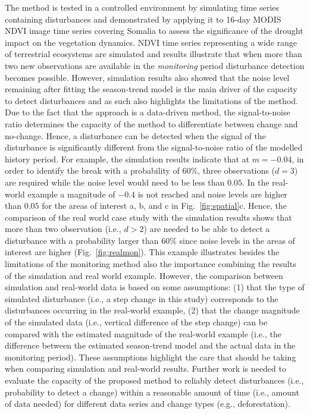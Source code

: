 \documentclass[authoryear,preprint,review,10pt]{elsarticle}
\begin{document}
The method is tested in a controlled environment by simulating time series containing disturbances and demonstrated by applying it to 16-day MODIS NDVI image time series covering Somalia to assess the significance of the drought impact on the vegetation dynamics. NDVI time series representing a wide range of terrestrial ecosystems are simulated and results illustrate that when more than two new observations are available in the \emph{monitoring} period disturbance detection becomes possible. However, simulation results also showed that the noise level remaining after fitting the season-trend model is the main driver of the capacity to detect disturbances and as such also highlights the limitations of the method. Due to the fact that the approach is a data-driven method, the signal-to-noise ratio determines the capacity of the method to differentiate between change and no-change. Hence, a disturbance can be detected when the signal of the disturbance is significantly different from the signal-to-noise ratio of the modelled history period. For example, the simulation results indicate that at $m = -0.04$, in order to identify the break with a probability of $60\%$, three observations ($d=3$) are required while the noise level would need to be less than $0.05$. In the real-world example a magnitude of $-0.4$ is not reached and noise levels are higher than $0.05$ for the areas of interest a, b, and c in Fig.~\ref{fig:spatial}c. Hence, the comparison of the real world case study with the simulation results shows that more than two observation (i.e., $d>2$) are needed to be able to detect a disturbance with a probability larger than $60\%$ since noise levels in the areas of interest are higher (Fig.~\ref{fig:realmon}). 
This example illustrates besides the limitations of the monitoring method also the importance combining the results of the simulation and real world example. However, the comparison between simulation and real-world data is based on some assumptions: (1) that the type of simulated disturbance (i.e., a step change in this study) corresponds to the disturbances occurring in the real-world example, 
(2) that the change magnitude of the simulated data (i.e., vertical difference of the step change) can be compared with the estimated magnitude of the real-world example (i.e., the difference between the estimated season-trend model and the actual data in the monitoring period). These assumptions highlight the care that should be taking when comparing simulation and real-world results. 
Further work is needed to evaluate the capacity of the proposed method to reliably detect disturbances (i.e., probability to detect a change) within a reasonable amount of time (i.e., amount of data needed) for different data series and change types (e.g., deforestation). 
\end{document}
